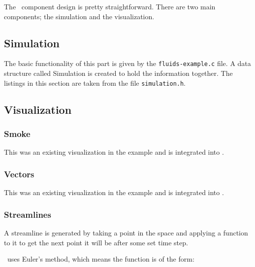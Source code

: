 
The \fluids\ component design is pretty straightforward. There are two main
components; the simulation and the visualization. 

\subsection{Simulation}

The basic functionality of this part is given by the \texttt{fluids-example.c}
file. A data structure called Simulation is created to hold the information
together. The listings in this section are taken from the file
\texttt{simulation.h}.



\subsection{Visualization}



\subsubsection{Smoke}

This was an existing visualization in the example and is integrated into
\fluids{}.



\subsubsection{Vectors}

This was an existing visualization in the example and is integrated into
\fluids{}.



\subsubsection{Streamlines}



A streamline is generated by taking a point in the space and applying a
function to it to get the next point it will be after some set time step.

\fluids\ uses Euler's method, which means the function is of the form:

